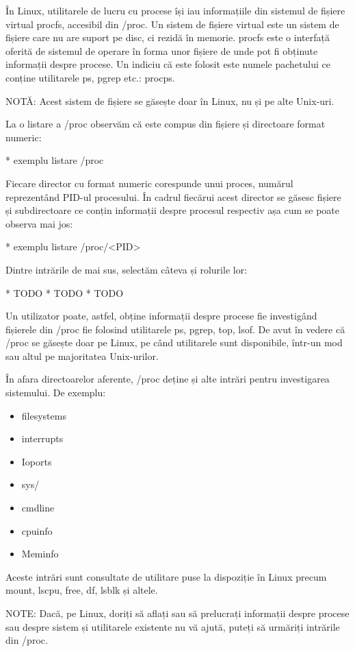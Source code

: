 În Linux, utilitarele de lucru cu procese își iau informațiile din sistemul de
fișiere virtual procfs, accesibil din /proc. Un sistem de fișiere virtual este
un sistem de fișiere care nu are suport pe disc, ci rezidă în memorie. procfs
este o interfață oferită de sistemul de operare în forma unor fișiere de unde
pot fi obținute informații despre procese. Un indiciu că este folosit este
numele pachetului ce conține utilitarele ps, pgrep etc.: procps.

NOTĂ: Acest sistem de fișiere se găsește doar în Linux, nu și pe alte Unix-uri.

La o listare a /proc observăm că este compus din fișiere și directoare format numeric:

* exemplu listare /proc

Fiecare director cu format numeric corespunde unui proces, numărul reprezentând
PID-ul procesului. În cadrul fiecărui acest director se găsesc fișiere și
subdirectoare ce conțin informații despre procesul respectiv așa cum se poate
observa mai jos:

* exemplu listare /proc/<PID>

Dintre intrările de mai sus, selectăm câteva și rolurile lor:

* TODO
* TODO
* TODO

Un utilizator poate, astfel, obține informații despre procese fie investigând
fișierele din /proc fie folosind utilitarele ps, pgrep, top, lsof. De avut în
vedere că /proc se găsește doar pe Linux, pe când utilitarele sunt disponibile,
într-un mod sau altul pe majoritatea Unix-urilor.

În afara directoarelor aferente, /proc deține și alte intrări pentru investigarea sistemului. De exemplu:

\begin{itemize}
	\item filesystems
	\item interrupts
	\item Ioports
	\item sys/
	\item cmdline
	\item cpuinfo
	\item Meminfo
\end{itemize}

Aceste intrări sunt consultate de utilitare puse la dispoziție în Linux precum
mount, lscpu, free, df, lsblk și altele.

NOTE: Dacă, pe Linux, doriți să aflați sau să prelucrați informații despre
procese sau despre sistem și utilitarele existente nu vă ajută, puteți să
urmăriți intrările din /proc.

